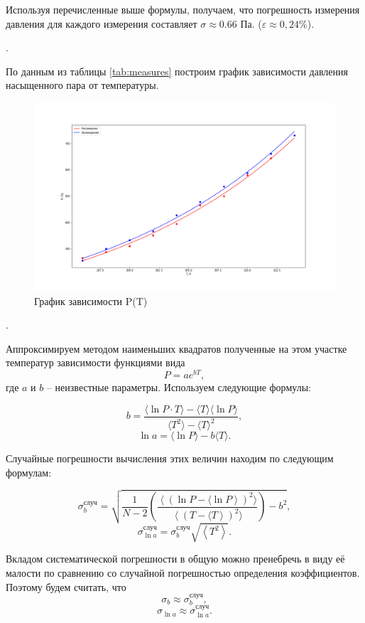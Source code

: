 \documentclass[a4paper, 12pt]{article}
\newcounter{Points}
\newcommand{\point}{\arabic{Points}. \addtocounter{Points}{1}}
\begin{document}
Используя перечисленные выше формулы, получаем, что погрешность измерения давления для каждого измерения составляет $ \sigma \approx 0.66 $ Па. ($ \varepsilon \approx 0,24 \% $). 
    
\point По данным из таблицы \ref{tab:measures} построим график зависимости давления насыщенного пара от температуры.

\begin{figure}
    \centering    
    \includegraphics[width=18cm]{P_from_T.png}
    \caption{График зависимости P(T)}
    \label{P_from_T}
\end{figure}
    

\point Аппроксимируем методом наименьших квадратов полученные на этом участке температур зависимости функциями вида \[ P=ae^{bT}, \] где $ a $ и $ b $ -- неизвестные параметры. Используем следующие формулы:

\[ b = \frac{\langle \ln P \cdot T \rangle - \langle T \rangle \langle \ln P \rangle}{\langle T^2 \rangle - \langle T \rangle ^2},\]
\[ \ln a = \langle \ln P \rangle - b\langle T \rangle. \]

Случайные погрешности вычисления этих величин находим по следующим формулам:

\[ \sigma^\text{случ}_b = \sqrt{\frac{1}{N-2} \left(\frac{\left\langle\left(\ln P - \langle \ln P\right\rangle\right)^2 \rangle}{\left\langle\left(T - \langle T\right\rangle\right)^2 \rangle}\right)-b^2},\]
\[ \sigma^\text{случ}_{\ln a}=\sigma^\text{случ}_b\sqrt{\left\langle T^2 \right\rangle}. \]

\label{mnk}

Вкладом систематической погрешности в общую можно пренебречь в виду её малости по сравнению со случайной погрешностью определения коэффициентов. Поэтому будем считать, что \[ \sigma_b \approx \sigma^\text{случ}_b, \] \[ \sigma_{\ln a} \approx \sigma^\text{случ}_{\ln a}. \]
\end{document}
